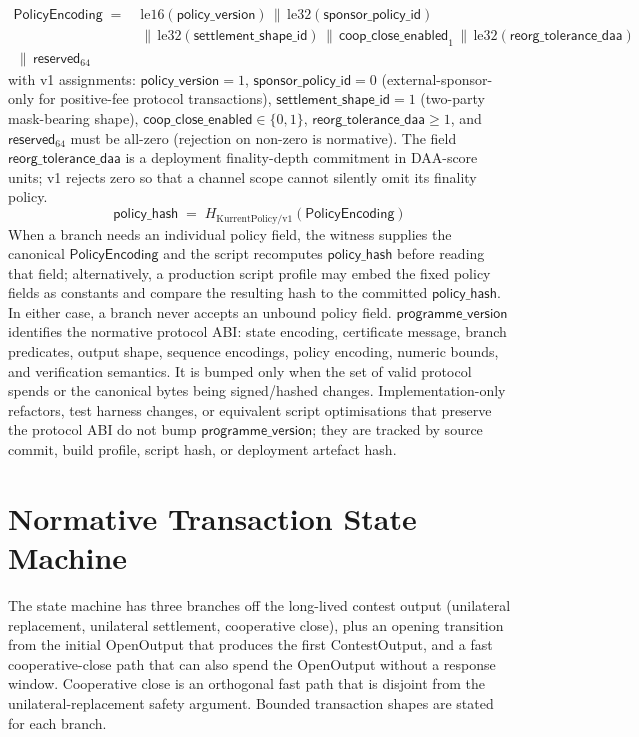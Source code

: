 \documentclass[10pt,a4paper]{article}
\begin{document}
\[
  \begin{aligned}
  \mathsf{PolicyEncoding} \;=\;& \mathrm{le16}(\mathsf{policy\_version})
   \,\|\, \mathrm{le32}(\mathsf{sponsor\_policy\_id}) \\
   & \|\, \mathrm{le32}(\mathsf{settlement\_shape\_id})
   \,\|\, \mathsf{coop\_close\_enabled}_{1}
   \,\|\, \mathrm{le32}(\mathsf{reorg\_tolerance\_daa}) \\
   \,\|\, \mathsf{reserved}_{64}
  \end{aligned}
\]
with v1 assignments: $\mathsf{policy\_version}=1$, $\mathsf{sponsor\_policy\_id}=0$ (external-sponsor-only for positive-fee protocol transactions), $\mathsf{settlement\_shape\_id}=1$ (two-party mask-bearing shape), $\mathsf{coop\_close\_enabled} \in \{0,1\}$, $\mathsf{reorg\_tolerance\_daa} \ge 1$, and $\mathsf{reserved}_{64}$ must be all-zero (rejection on non-zero is normative).
The field $\mathsf{reorg\_tolerance\_daa}$ is a deployment finality-depth commitment in DAA-score units; v1 rejects zero so that a channel scope cannot silently omit its finality policy.
\[
  \mathsf{policy\_hash} \;=\; H_{\mathrm{KurrentPolicy/v1}}(\mathsf{PolicyEncoding})
\]
When a branch needs an individual policy field, the witness supplies the canonical $\mathsf{PolicyEncoding}$ and the script recomputes $\mathsf{policy\_hash}$ before reading that field; alternatively, a production script profile may embed the fixed policy fields as constants and compare the resulting hash to the committed $\mathsf{policy\_hash}$. In either case, a branch never accepts an unbound policy field.
$\mathsf{programme\_version}$ identifies the normative protocol ABI: state encoding, certificate message, branch predicates, output shape, sequence encodings, policy encoding, numeric bounds, and verification semantics. It is bumped only when the set of valid protocol spends or the canonical bytes being signed/hashed changes. Implementation-only refactors, test harness changes, or equivalent script optimisations that preserve the protocol ABI do not bump $\mathsf{programme\_version}$; they are tracked by source commit, build profile, script hash, or deployment artefact hash.

\section{Normative Transaction State Machine}
\label{sec:state-machine}

The state machine has three branches off the long-lived contest output (unilateral replacement, unilateral settlement, cooperative close), plus an opening transition from the initial OpenOutput that produces the first ContestOutput, and a fast cooperative-close path that can also spend the OpenOutput without a response window. Cooperative close is an orthogonal fast path that is disjoint from the unilateral-replacement safety argument. Bounded transaction shapes are stated for each branch.
\end{document}
